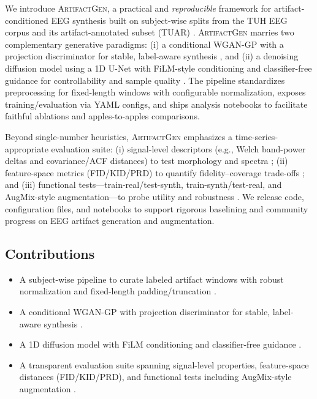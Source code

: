 \documentclass{article}
\begin{document}
We introduce \textsc{ArtifactGen}, a practical and \emph{reproducible} framework for artifact-conditioned EEG synthesis built on subject-wise splits from the TUH EEG corpus and its artifact-annotated subset (TUAR) \citep{obeid2016tuh,hamid2020tuar}. \textsc{ArtifactGen} marries two complementary generative paradigms: (i) a conditional WGAN-GP with a projection discriminator for stable, label-aware synthesis \citep{gulrajani2017improved,miyato2018cgans}, and (ii) a denoising diffusion model using a 1D U-Net with FiLM-style conditioning \citep{perez2018film} and classifier-free guidance for controllability and sample quality \citep{ho2020denoising,ho2022classifierfree}. The pipeline standardizes preprocessing for fixed-length windows with configurable normalization, exposes training/evaluation via YAML configs, and ships analysis notebooks to facilitate faithful ablations and apples-to-apples comparisons.

Beyond single-number heuristics, \textsc{ArtifactGen} emphasizes a time-series-appropriate evaluation suite: (i) signal-level descriptors (e.g., Welch band-power deltas and covariance/ACF distances) to test morphology and spectra \citep{welch1967psd}; (ii) feature-space metrics (FID/KID/PRD) to quantify fidelity–coverage trade-offs \citep{heusel2017gans,binkowski2018demystifying,sajjadi2018assessing}; and (iii) functional tests—train-real/test-synth, train-synth/test-real, and AugMix-style augmentation—to probe utility and robustness \citep{hendrycks2020augmix}. We release code, configuration files, and notebooks to support rigorous baselining and community progress on EEG artifact generation and augmentation.

\subsection{Contributions}
\begin{itemize}
    \item A subject-wise pipeline to curate labeled artifact windows with robust normalization and fixed-length padding/truncation \citep{obeid2016tuh,hamid2020tuar}.
    \item A conditional WGAN-GP with projection discriminator for stable, label-aware synthesis \citep{gulrajani2017improved,miyato2018cgans}.
    \item A 1D diffusion model with FiLM conditioning and classifier-free guidance \citep{perez2018film,ho2020denoising,ho2022classifierfree}.
    \item A transparent evaluation suite spanning signal-level properties, feature-space distances (FID/KID/PRD), and functional tests including AugMix-style augmentation \citep{heusel2017gans,binkowski2018demystifying,sajjadi2018assessing,hendrycks2020augmix,welch1967psd}.
\end{itemize}
\end{document}
